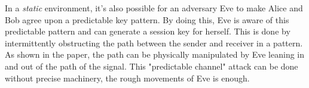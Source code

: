 \documentclass[11pt]{article}
\begin{document}
In a \textit{static} environment, it's also possible for an adversary Eve to make Alice and Bob agree upon a predictable key pattern. By doing this, Eve is aware of this predictable pattern and can generate a session key for herself. This is done by intermittently obstructing the path between the sender and receiver in a pattern. As shown in the paper, the path can be physically manipulated by Eve leaning in and out of the path of the signal. This "predictable channel" attack can be done without precise machinery, the rough movements of Eve is enough.
\end{document}
